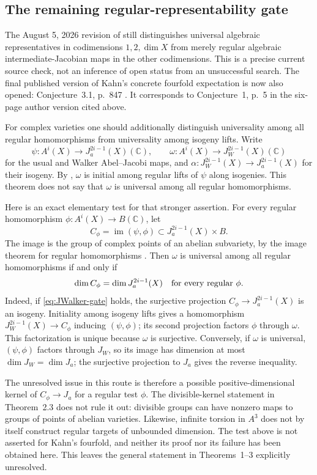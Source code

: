 \subsection{The remaining regular-representability gate}
The August 5, 2026 revision of
\cite[Introduction, p.~1]{DGJ_ACMVTwist2026} still distinguishes
universal algebraic representatives in codimensions $1,2,\dim X$
from merely regular algebraic intermediate-Jacobian maps in
the other codimensions. This is a precise current source check,
not an inference of open status from an unsuccessful search.
The final published version of Kahn's concrete fourfold
expectation is now also opened: Conjecture~3.1, p.~847
\cite{DGJ_Kahn2021}. It corresponds to Conjecture~1, p.~5 in
the six-page author version cited above.

For complex varieties one should additionally distinguish
universality among all regular homomorphisms from universality
among isogeny lifts. Write
\[
 \psi:A^i(X)\longrightarrow J_a^{2i-1}(X)(\mathbb C),\qquad
 \omega:A^i(X)\longrightarrow J_W^{2i-1}(X)(\mathbb C)
\]
for the usual and Walker Abel--Jacobi maps, and
$\alpha:J_W^{2i-1}(X)\to J_a^{2i-1}(X)$ for their isogeny.
By \cite[Theorem 2.3, p.~12]{DGJ_ACMVWalker}, $\omega$ is
initial among regular lifts of $\psi$ along isogenies. This
theorem does not say that $\omega$ is universal among all
regular homomorphisms.

Here is an exact elementary test for that stronger assertion.
For every regular homomorphism
$\phi:A^i(X)\to B(\mathbb C)$, let
\[
 C_\phi=\operatorname{im}(\psi,\phi)
       \subset J_a^{2i-1}(X)\times B.
\]
The image is the group of complex points of an abelian
subvariety, by the image theorem for regular homomorphisms
\cite[Lemma 4.7, pp.~18--19]{DGJ_ACMVFunctor}.
Then $\omega$ is universal among all regular homomorphisms
if and only if
\begin{equation}\label{eq:JWalker-gate}
 \dim C_\phi=\dim J_a^{2i-1}(X)
 \quad\hbox{for every regular }\phi.
\end{equation}
Indeed, if \eqref{eq:JWalker-gate} holds, the surjective
projection $C_\phi\to J_a^{2i-1}(X)$ is an isogeny. Initiality
among isogeny lifts gives a homomorphism
$J_W^{2i-1}(X)\to C_\phi$ inducing $(\psi,\phi)$; its second
projection factors $\phi$ through $\omega$. This factorization
is unique because $\omega$ is surjective. Conversely, if
$\omega$ is universal, $(\psi,\phi)$ factors through $J_W$,
so its image has dimension at most $\dim J_W=\dim J_a$;
the surjective projection to $J_a$ gives the reverse inequality.

The unresolved issue in this route is therefore a possible
positive-dimensional kernel of $C_\phi\to J_a$ for a regular
test $\phi$. The divisible-kernel statement in Theorem~2.3
does not rule it out: divisible groups can have nonzero maps
to groups of points of abelian varieties. Likewise, infinite
torsion in $A^3$ does not by itself construct regular targets
of unbounded dimension. The test above is not asserted for
Kahn's fourfold, and neither its proof nor its failure has
been obtained here. This leaves the general statement in
Theorems~1--3 explicitly unresolved.
